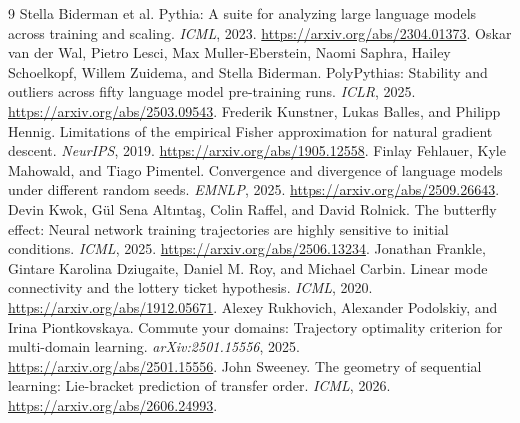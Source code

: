 \documentclass{article}
\begin{document}
\clearpage
\begin{thebibliography}{9}
 Stella Biderman et al. Pythia: A suite for analyzing large language models across training and scaling. \emph{ICML}, 2023. \url{https://arxiv.org/abs/2304.01373}.
 Oskar van der Wal, Pietro Lesci, Max Muller-Eberstein, Naomi Saphra, Hailey Schoelkopf, Willem Zuidema, and Stella Biderman. PolyPythias: Stability and outliers across fifty language model pre-training runs. \emph{ICLR}, 2025. \url{https://arxiv.org/abs/2503.09543}.
 Frederik Kunstner, Lukas Balles, and Philipp Hennig. Limitations of the empirical Fisher approximation for natural gradient descent. \emph{NeurIPS}, 2019. \url{https://arxiv.org/abs/1905.12558}.
 Finlay Fehlauer, Kyle Mahowald, and Tiago Pimentel. Convergence and divergence of language models under different random seeds. \emph{EMNLP}, 2025. \url{https://arxiv.org/abs/2509.26643}.
 Devin Kwok, G\"ul Sena Alt{\i}nta{\c{s}}, Colin Raffel, and David Rolnick. The butterfly effect: Neural network training trajectories are highly sensitive to initial conditions. \emph{ICML}, 2025. \url{https://arxiv.org/abs/2506.13234}.
 Jonathan Frankle, Gintare Karolina Dziugaite, Daniel M. Roy, and Michael Carbin. Linear mode connectivity and the lottery ticket hypothesis. \emph{ICML}, 2020. \url{https://arxiv.org/abs/1912.05671}.
 Alexey Rukhovich, Alexander Podolskiy, and Irina Piontkovskaya. Commute your domains: Trajectory optimality criterion for multi-domain learning. \emph{arXiv:2501.15556}, 2025. \url{https://arxiv.org/abs/2501.15556}.
 John Sweeney. The geometry of sequential learning: Lie-bracket prediction of transfer order. \emph{ICML}, 2026. \url{https://arxiv.org/abs/2606.24993}.
\end{thebibliography}
\end{document}
